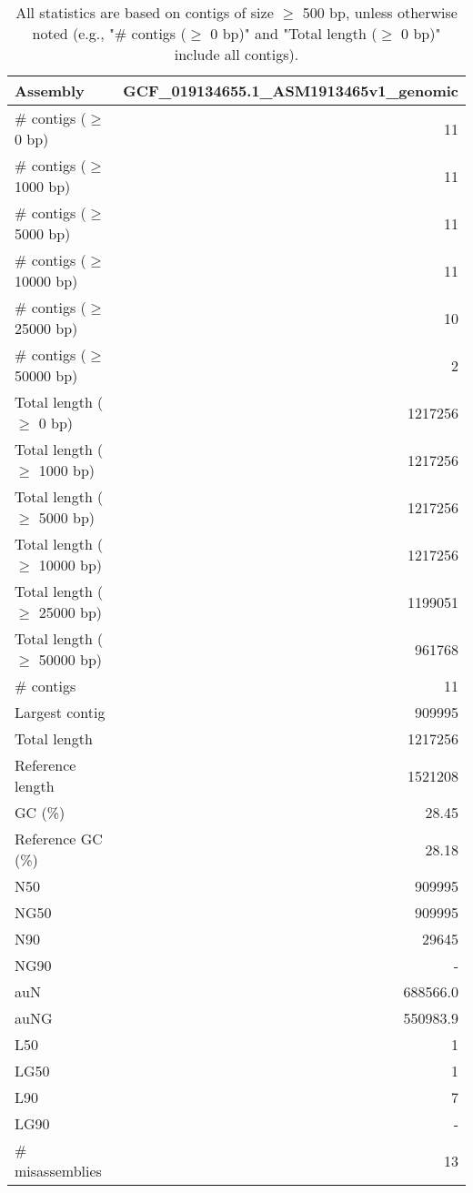 \documentclass[12pt,a4paper]{article}
\begin{document}
\begin{table}[ht]
\begin{center}
\caption{All statistics are based on contigs of size $\geq$ 500 bp, unless otherwise noted (e.g., "\# contigs ($\geq$ 0 bp)" and "Total length ($\geq$ 0 bp)" include all contigs).}
\begin{tabular}{|l*{1}{|r}|}
\hline
Assembly & GCF\_019134655.1\_ASM1913465v1\_genomic \\ \hline
\# contigs ($\geq$ 0 bp) & 11 \\ \hline
\# contigs ($\geq$ 1000 bp) & 11 \\ \hline
\# contigs ($\geq$ 5000 bp) & 11 \\ \hline
\# contigs ($\geq$ 10000 bp) & 11 \\ \hline
\# contigs ($\geq$ 25000 bp) & 10 \\ \hline
\# contigs ($\geq$ 50000 bp) & 2 \\ \hline
Total length ($\geq$ 0 bp) & 1217256 \\ \hline
Total length ($\geq$ 1000 bp) & 1217256 \\ \hline
Total length ($\geq$ 5000 bp) & 1217256 \\ \hline
Total length ($\geq$ 10000 bp) & 1217256 \\ \hline
Total length ($\geq$ 25000 bp) & 1199051 \\ \hline
Total length ($\geq$ 50000 bp) & 961768 \\ \hline
\# contigs & 11 \\ \hline
Largest contig & 909995 \\ \hline
Total length & 1217256 \\ \hline
Reference length & 1521208 \\ \hline
GC (\%) & 28.45 \\ \hline
Reference GC (\%) & 28.18 \\ \hline
N50 & 909995 \\ \hline
NG50 & 909995 \\ \hline
N90 & 29645 \\ \hline
NG90 & - \\ \hline
auN & 688566.0 \\ \hline
auNG & 550983.9 \\ \hline
L50 & 1 \\ \hline
LG50 & 1 \\ \hline
L90 & 7 \\ \hline
LG90 & - \\ \hline
\# misassemblies & 13 \\ \hline

\end{tabular}
\end{center}
\end{table}
\end{document}
